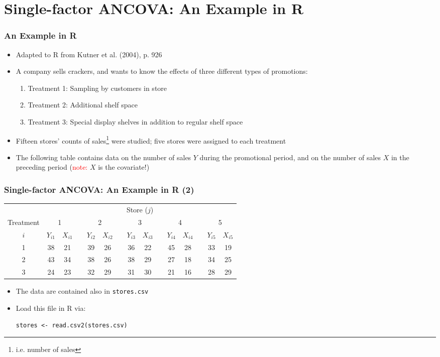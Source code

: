 \documentclass[10pt]{beamer}
\theoremstyle{definition}
\begin{document}
\section{Single-factor ANCOVA: An Example in R}
\begin{frame}[fragile]
\frametitle{An Example in R}
\begin{itemize}
	\item Adapted to R from Kutner et al. (2004), p. 926
	\item A company sells crackers, and wants to know the effects of three different types of promotions:
	\begin{enumerate}
		\item Treatment 1: Sampling by customers in store
		\item Treatment 2: Additional shelf space
		\item Treatment 3: Special display shelves in addition to regular shelf space
	\end{enumerate}
		\item Fifteen stores' counts of sales\footnote{i.e. number of sales} were studied; five stores were assigned to each treatment
		\item The following table contains data on the number of sales $Y$ during the promotional period, and on the number of sales $X$ in the preceding period (\textcolor{red}{note:} $X$ is the covariate!)
\end{itemize}
\end{frame}

\begin{frame}[fragile]
\frametitle{Single-factor ANCOVA: An Example in R (2)}
\begin{tabular}{ccccccccccccccc}
\hline
 & \multicolumn{14}{c}{Store ($j$)}\\
\cline{2-15}
Treatment & \multicolumn{2}{c}{1} & & \multicolumn{2}{c}{2} & & \multicolumn{2}{c}{3} & & \multicolumn{2}{c}{4} && \multicolumn{2}{c}{5}\\
\cline{2-3} \cline{5-6} \cline{8-9} \cline{11-12} \cline{14-15}
$i$ & $Y_{i1}$ & $X_{i1}$ & & $Y_{i2}$ & $X_{i2}$ & & $Y_{i3}$ & $X_{i3}$ && $Y_{i4}$ & $X_{i4}$ && $Y_{i5}$ & $X_{i5}$\\
1 & 38 & 21 && 39 & 26 && 36 & 22 && 45 & 28 && 33 & 19 \\
2 & 43 & 34 && 38 & 26 && 38 & 29 && 27 & 18 && 34 & 25\\
3 & 24 & 23 && 32 & 29 && 31 & 30 && 21 & 16 && 28 & 29
\end{tabular}

\begin{itemize}
	\item The data are contained also in \texttt{stores.csv}
	\item Load this file in R via:
	\begin{lstlisting}[style = rstyle, breaklines] 
	stores <- read.csv2(stores.csv)
	\end{lstlisting}
	
\end{itemize}
\end{frame}
\end{document}
